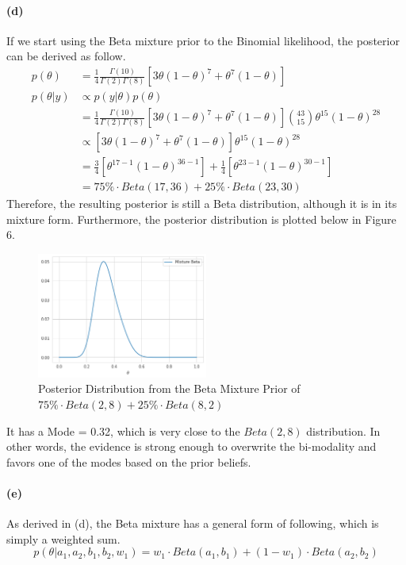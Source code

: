 \documentclass[11pt, letterpaper]{article}
\begin{document}
\paragraph{(d)}
If we start using the Beta mixture prior to the Binomial likelihood, the posterior can be derived as follow.
\begin{align*}
    p(\theta) &= \frac{1}{4}\frac{\Gamma(10)}{\Gamma(2)\Gamma(8)}[3\theta{(1-\theta)}^7+\theta^7(1-\theta)] \\
    p(\theta|y) &\propto p(y|\theta)p(\theta) \\
        &= \frac{1}{4}\frac{\Gamma(10)}{\Gamma(2)\Gamma(8)}[3\theta{(1-\theta)}^7+\theta^7(1-\theta)] \binom{43}{15}\theta^{15}{(1-\theta)}^{28} \\
        &\propto [3\theta{(1-\theta)}^7+\theta^7(1-\theta)] \theta^{15}{(1-\theta)}^{28} \\
        &= \frac{3}{4}[\theta^{17-1}{(1-\theta)}^{36-1}] + \frac{1}{4}[\theta^{23-1}{(1-\theta)}^{30-1}] \\
        &= 75\% \cdot Beta(17, 36) + 25\% \cdot Beta(23, 30)
\end{align*}
Therefore, the resulting posterior is still a Beta distribution, although it is in its mixture form.
Furthermore, the posterior distribution is plotted below in Figure 6.

\begin{figure}[h]
    \captionsetup{justification=centering, margin=2cm}
    \centering
    \includegraphics[width=0.5\textwidth]{hw2_3.4.d.png}
    \caption{Posterior Distribution from the Beta Mixture Prior of $75\% \cdot Beta(2, 8) + 25\% \cdot Beta(8, 2)$}
\end{figure}

It has a Mode = 0.32, which is very close to the $Beta(2, 8)$ distribution. In other words, the evidence is 
strong enough to overwrite the bi-modality and favors one of the modes based on the prior beliefs.

\paragraph{(e)}
As derived in (d), the Beta mixture has a general form of following, which is simply a weighted sum.
\[
    p(\theta|a_1, a_2, b_1, b_2, w_1) = w_1\cdot Beta(a_1, b_1) + (1-w_1) \cdot Beta(a_2, b_2)
\]
\end{document}
